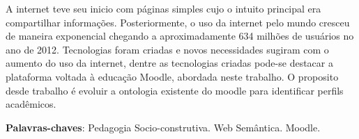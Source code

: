 \begin{resumo}
A internet teve seu inicio com páginas simples cujo o intuito principal era compartilhar informações. Posteriormente, o uso da internet pelo mundo cresceu de maneira exponencial chegando a aproximadamente 634 milhões de usuários no ano de 2012. Tecnologias foram criadas e novos necessidades sugiram com o aumento do uso da internet, dentre as tecnologias criadas pode-se destacar a plataforma voltada à educação Moodle, abordada neste trabalho. O proposito desde trabalho é evoluir a ontologia existente do moodle para identificar perfils acadêmicos.

 \vspace{\onelineskip}
    
 \noindent
 \textbf{Palavras-chaves}: Pedagogia Socio-construtiva.  Web Semântica. Moodle.
\end{resumo}
